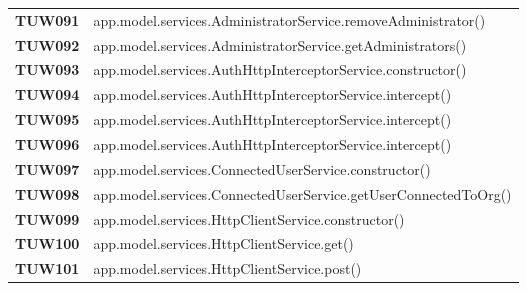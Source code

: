 \documentclass[../../piano-di-qualifica.tex]{subfiles}
\begin{document}
\begin{longtable}[H]{>{\centering\bfseries}m{3cm} >{}m{13cm}}
  TUW091             & app.model.services.AdministratorService.removeAdministrator\@()                                         \\

  TUW092             & app.model.services.AdministratorService.getAdministrators\@()                                           \\



  TUW093             & app.model.services.AuthHttpInterceptorService.constructor\@()                                           \\

  TUW094             & app.model.services.AuthHttpInterceptorService.intercept\@()                                             \\

  TUW095             & app.model.services.AuthHttpInterceptorService.intercept\@()                                             \\

  TUW096             & app.model.services.AuthHttpInterceptorService.intercept\@()                                             \\




  TUW097             & app.model.services.ConnectedUserService.constructor\@()                                                 \\

  TUW098             & app.model.services.ConnectedUserService.getUserConnectedToOrg\@()                                       \\



  TUW099             & app.model.services.HttpClientService.constructor\@()                                                    \\

  TUW100             & app.model.services.HttpClientService.get\@()                                                            \\

  TUW101             & app.model.services.HttpClientService.post\@()                                                           \\


\end{longtable}
\end{document}
